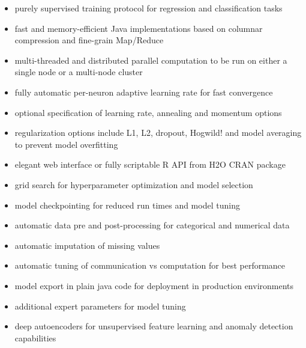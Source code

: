 \begin{itemize}

\item purely supervised training protocol for regression and classification tasks

\item fast and memory-efficient Java implementations based on columnar compression and fine-grain Map/Reduce

\item multi-threaded and distributed parallel computation to be run on either a single node or a multi-node cluster

\item fully automatic per-neuron adaptive learning rate for fast convergence

\item optional specification of learning rate, annealing and momentum options

\item regularization options include L1, L2, dropout, Hogwild! and model averaging to prevent model overfitting

\item elegant web interface or fully scriptable R API from H2O CRAN package

\item grid search for hyperparameter optimization and model selection

\item model checkpointing for reduced run times and model tuning

\item automatic data pre and post-processing for categorical and numerical data

\item automatic imputation of missing values

\item automatic tuning of communication vs computation for best performance  %

\item model export in plain java code for deployment in production environments

\item additional expert parameters for model tuning

\item deep autoencoders for unsupervised feature learning and anomaly detection capabilities

\end{itemize}


